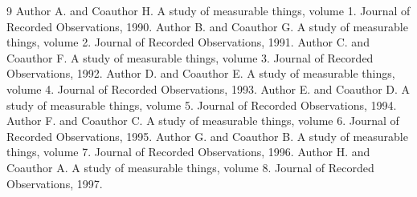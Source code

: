 \documentclass{article}
\begin{document}
\begin{thebibliography}{9}
 Author A. and Coauthor H. A study of measurable things, volume 1. Journal of Recorded Observations, 1990.
 Author B. and Coauthor G. A study of measurable things, volume 2. Journal of Recorded Observations, 1991.
 Author C. and Coauthor F. A study of measurable things, volume 3. Journal of Recorded Observations, 1992.
 Author D. and Coauthor E. A study of measurable things, volume 4. Journal of Recorded Observations, 1993.
 Author E. and Coauthor D. A study of measurable things, volume 5. Journal of Recorded Observations, 1994.
 Author F. and Coauthor C. A study of measurable things, volume 6. Journal of Recorded Observations, 1995.
 Author G. and Coauthor B. A study of measurable things, volume 7. Journal of Recorded Observations, 1996.
 Author H. and Coauthor A. A study of measurable things, volume 8. Journal of Recorded Observations, 1997.
\end{thebibliography}
\end{document}
